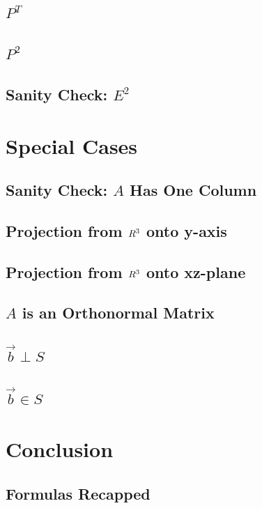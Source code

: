 \documentclass[12pt]{beamer}
\begin{document}
\subsection{$P^T$}

\subsection{$P^2$}

\subsection{Sanity Check: $E^2$}

\section{Special Cases}

\subsection{Sanity Check: $A$ Has One Column}

\subsection{Projection from $\boldmath{R}^3$ onto y-axis}

\subsection{Projection from $\boldmath{R}^3$ onto xz-plane}

\subsection{$A$ is an Orthonormal Matrix}

\subsection{$\vec{b} \perp S$}

\subsection{$\vec{b} \in S$}

\section{Conclusion}

\subsection{Formulas Recapped}
\end{document}
